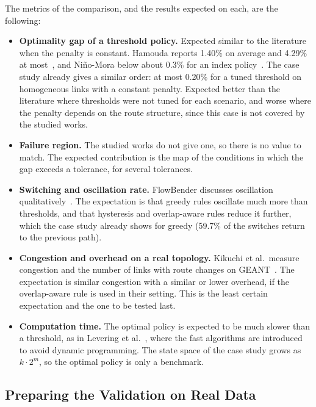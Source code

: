 \documentclass[11pt,a4paper]{article}
\begin{document}
The metrics of the comparison, and the results expected on each, are the following:
\begin{itemize}[leftmargin=*]
  \item \textbf{Optimality gap of a threshold policy.} Expected similar to the literature when the penalty is constant. Hamouda reports 1.40\% on average and 4.29\% at most~\cite{hamouda2020}, and Ni\~no-Mora below about 0.3\% for an index policy~\cite{ninomora2008}. The case study already gives a similar order: at most 0.20\% for a tuned threshold on homogeneous links with a constant penalty. Expected better than the literature where thresholds were not tuned for each scenario, and worse where the penalty depends on the route structure, since this case is not covered by the studied works.
  \item \textbf{Failure region.} The studied works do not give one, so there is no value to match. The expected contribution is the map of the conditions in which the gap exceeds a tolerance, for several tolerances.
  \item \textbf{Switching and oscillation rate.} FlowBender discusses oscillation qualitatively~\cite{kabbani2014}. The expectation is that greedy rules oscillate much more than thresholds, and that hysteresis and overlap-aware rules reduce it further, which the case study already shows for greedy (59.7\% of the switches return to the previous path).
  \item \textbf{Congestion and overhead on a real topology.} Kikuchi et al.\ measure congestion and the number of links with route changes on GEANT~\cite{kikuchi2025}. The expectation is similar congestion with a similar or lower overhead, if the overlap-aware rule is used in their setting. This is the least certain expectation and the one to be tested last.
  \item \textbf{Computation time.} The optimal policy is expected to be much slower than a threshold, as in Levering et al.~\cite{levering2022}, where the fast algorithms are introduced to avoid dynamic programming. The state space of the case study grows as $k \cdot 2^m$, so the optimal policy is only a benchmark.
\end{itemize}

\subsection{Preparing the Validation on Real Data}
\end{document}
